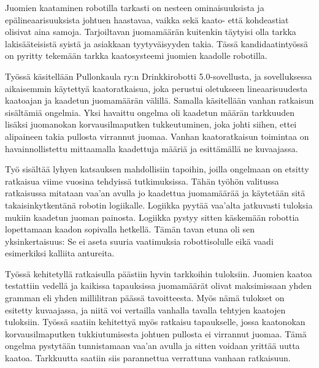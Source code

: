 Juomien kaataminen robotilla tarkasti on nesteen ominaisuuksista ja epälineaarisuuksista johtuen haastavaa, vaikka sekä kaato- että kohdeastiat olisivat aina samoja. Tarjoiltavan juomamäärän kuitenkin täytyisi olla tarkka lakisääteisistä syistä ja asiakkaan tyytyväisyyden takia. Tässä kandidaatintyössä on pyritty tekemään tarkka kaatosysteemi juomien kaadolle robotilla.

Työssä käsitellään Pullonkaula ry:n Drinkkirobotti 5.0\hyp{}sovellusta, ja sovelluksessa aikaisemmin käytettyä kaatoratkaisua, joka perustui oletukseen lineaarisuudesta kaatoajan ja kaadetun juomamäärän välillä. Samalla käsitellään vanhan ratkaisun sisältämiä ongelmia. Yksi havaittu ongelma oli kaadetun määrän tarkkuuden lisäksi juomanokan korvausilmaputken tukkeutuminen, joka johti siihen, ettei alipaineen takia pullosta virrannut juomaa. Vanhan kaatoratkaisun toimintaa on havainnollistettu mittaamalla kaadettuja määriä ja esittämällä ne kuvaajassa.

Työ sisältää lyhyen katsauksen mahdollisiin tapoihin, joilla ongelmaan on etsitty ratkaisua viime vuosina tehdyissä tutkimuksissa. Tähän työhön valitussa ratkaisussa mitataan vaa'an avulla jo kaadettua juomamäärää ja käytetään sitä takaisinkytkentänä robotin logiikalle. Logiikka pyytää vaa'alta jatkuvasti tuloksia mukiin kaadetun juoman painosta. Logiikka pystyy sitten käskemään robottia lopettamaan kaadon sopivalla hetkellä. Tämän tavan etuna oli sen yksinkertaisuus: Se ei aseta suuria vaatimuksia robottisolulle eikä vaadi esimerkiksi kalliita antureita.

Työssä kehitetyllä ratkaisulla päästiin hyvin tarkkoihin tuloksiin. Juomien kaatoa testattiin vedellä ja kaikissa tapauksissa juomamäärät olivat maksimissaan yhden gramman eli yhden millilitran päässä tavoitteesta. Myös nämä tulokset on esitetty kuvaajassa, ja niitä voi vertailla vanhalla tavalla tehtyjen kaatojen tuloksiin. Työssä saatiin kehitettyä myös ratkaisu tapaukselle, jossa kaatonokan korvausilmaputken tukkiutumisesta johtuen pullosta ei virrannut juomaa. Tämä ongelma pystytään tunnistamaan vaa'an avulla ja sitten voidaan yrittää uutta kaatoa. Tarkkuutta saatiin siis parannettua verrattuna vanhaan ratkaisuun.
